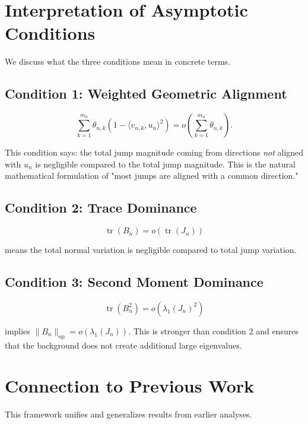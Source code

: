 \documentclass{article}
\begin{document}
\section{Interpretation of Asymptotic Conditions}

We discuss what the three conditions mean in concrete terms.

\subsection{Condition 1: Weighted Geometric Alignment}

\[
\sum_{k=1}^{m_n} \theta_{n,k} \left(1 - \langle v_{n,k}, u_n \rangle^2 \right) = o\left(\sum_{k=1}^{m_n} \theta_{n,k}\right).
\]

This condition says: the total jump magnitude coming from directions \emph{not} aligned with \(u_n\) is negligible compared to the total jump magnitude. This is the natural mathematical formulation of "most jumps are aligned with a common direction."

\subsection{Condition 2: Trace Dominance}

\[
\operatorname{tr}(B_n) = o(\operatorname{tr}(J_n))
\]

means the total normal variation is negligible compared to total jump variation.

\subsection{Condition 3: Second Moment Dominance}

\[
\operatorname{tr}(B_n^2) = o(\lambda_1(J_n)^2)
\]

implies \(\|B_n\|_{\mathrm{op}} = o(\lambda_1(J_n))\). This is stronger than condition 2 and ensures that the background does not create additional large eigenvalues.

\section{Connection to Previous Work}

This framework unifies and generalizes results from earlier analyses.
\end{document}
